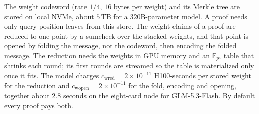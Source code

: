 \documentclass[11pt]{article}
\newcommand{\F}{\mathbb{F}}
\newcommand{\Fq}{\F_{p^4}}
\begin{document}
The weight codeword (rate \(1/4\), \(16\) bytes per weight) and its Merkle tree are stored on local NVMe, about \(5\)\,TB for a \(320\)B-parameter model.
A proof needs only query-position leaves from this store.
The weight claims of a proof are reduced to one point by a sumcheck over the stacked weights, and that point is opened by folding the message, not the codeword, then encoding the folded message.
The reduction needs the weights in GPU memory and an \(\Fq\) table that shrinks each round; its first rounds are streamed so the table is materialized only once it fits.
The model charges \(c_{\mathrm{wred}} = 2\times 10^{-11}\) H100-seconds per stored weight for the reduction and \(c_{\mathrm{wopen}} = 2\times 10^{-11}\) for the fold, encoding and opening, together about \(2.8\) seconds on the eight-card node for GLM-5.3-Flash.
By default every proof pays both.
\end{document}
